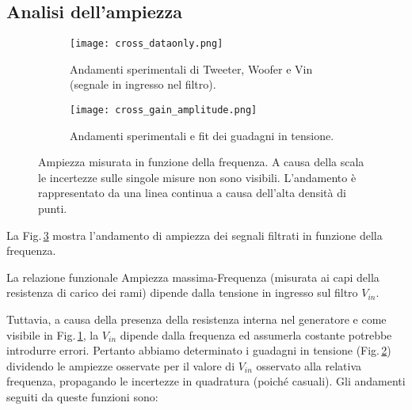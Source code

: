 \documentclass[../Relazione_circuiti]{subfiles}
\begin{document}
\subsection{Analisi dell'ampiezza}

  \begin{figure}[H]
    \centering

    \begin{subfigure}[t]{=0.49\textwidth}

      \texttt{[image: cross\_dataonly.png]}

      \caption{Andamenti sperimentali di Tweeter, Woofer e Vin (segnale in ingresso nel filtro).}
      \label{fig: amplitude_dataonly}

    \end{subfigure}
    \hfill
    \begin{subfigure}[t]{=0.49\textwidth}

      \texttt{[image: cross\_gain\_amplitude.png]}

      \caption
      {Andamenti sperimentali e fit dei guadagni in tensione.}
      \label{fig:cross_gain}
    \end{subfigure}

    \caption{
      Ampiezza misurata in funzione della frequenza.
      A causa della scala le incertezze sulle singole misure non sono visibili.
      L'andamento è rappresentato da una linea continua a causa dell'alta densità di punti.
    }

    \label{fig:cross_amplitude}

  \end{figure}

  La Fig.\,\ref{fig:cross_amplitude} mostra l'andamento di ampiezza dei segnali filtrati in funzione della frequenza.

  La relazione funzionale Ampiezza massima-Frequenza (misurata ai capi della resistenza di carico dei rami) dipende
  dalla tensione in ingresso sul filtro $V_{in}$.

  Tuttavia, a causa della presenza della resistenza interna nel generatore e come visibile in
  Fig.\,\ref{fig: amplitude_dataonly}, la $V_{in}$
  dipende dalla frequenza ed assumerla costante potrebbe introdurre errori.
  Pertanto abbiamo determinato i guadagni in tensione (Fig.\,\ref{fig:cross_gain}) dividendo le ampiezze osservate per
  il valore di $V_{in}$
  osservato alla relativa frequenza, propagando le incertezze in quadratura (poiché casuali).
  Gli andamenti seguiti da queste funzioni sono:
\end{document}
